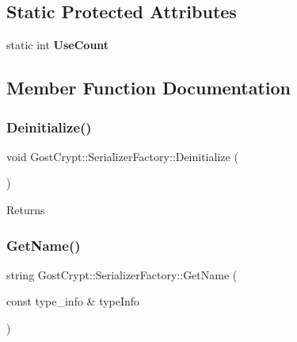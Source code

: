 \subsection*{Static Protected Attributes}
\begin{DoxyCompactItemize}
\item 
\mbox{\label{class_gost_crypt_1_1_serializer_factory_a87fe09f72782ec235807f7cd3da015a8}} 
static int {\bfseries Use\+Count}
\end{DoxyCompactItemize}


\subsection{Member Function Documentation}
\mbox{\label{class_gost_crypt_1_1_serializer_factory_a9cd502ea1af1fb4f3d733226c868ecfb}} 
\subsubsection{\texorpdfstring{Deinitialize()}{Deinitialize()}}
{\footnotesize\ttfamily void Gost\+Crypt\+::\+Serializer\+Factory\+::\+Deinitialize (\begin{DoxyParamCaption}{ }\end{DoxyParamCaption})\hspace{0.3cm}{\ttfamily [static]}}

\begin{DoxyReturn}{Returns}

\end{DoxyReturn}
\mbox{\label{class_gost_crypt_1_1_serializer_factory_a01d730c850465ebe1d4d08351f755d31}} 
\subsubsection{\texorpdfstring{Get\+Name()}{GetName()}}
{\footnotesize\ttfamily string Gost\+Crypt\+::\+Serializer\+Factory\+::\+Get\+Name (\begin{DoxyParamCaption}\item[{const type\+\_\+info \&}]{type\+Info }\end{DoxyParamCaption})\hspace{0.3cm}{\ttfamily [static]}}



